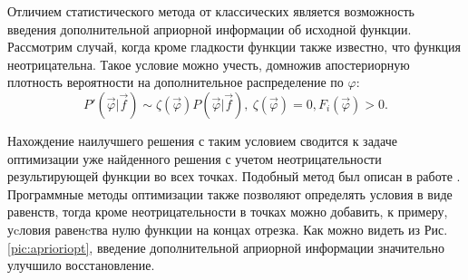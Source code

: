 Отличием статистического метода от классических является возможность введения дополнительной априорной информации об исходной функции. Рассмотрим случай, когда кроме гладкости функции также известно, что функция неотрицательна. Такое условие можно учесть, домножив апостериорную плотность вероятности на дополнительное распределение по $\varphi$:
\begin{equation}
    P'(\vec{\varphi}|\vec{f}) \sim \zeta(\vec{\varphi})P(\vec{\varphi}|\vec{f}), ~\zeta(\vec{\varphi})=0,  F_i(\vec{\varphi})>0. 
\end{equation}

Нахождение наилучшего решения с таким условием сводится к задаче оптимизации уже найденного решения с учетом неотрицательности результирующей функции во всех точках. Подобный метод был описан в работе \cite{turovceva}. Программные методы оптимизации также позволяют определять условия в виде равенств, тогда кроме неотрицательности в точках можно добавить, к примеру, уcловия равенcтва нулю функции на концах отрезка. Как можно видеть из Рис.\ref{pic:aprioriopt}, введение дополнительной априорной информации значительно улучшило восстановление.

\begin{comment}
\begin{figure}[h!]
\begin{center}
\begin{minipage}[h]{0.45\linewidth}
\texttt{[image: no-negative1]} \\а)
\end{minipage}
\hfill 
\begin{minipage}[h]{0.45\linewidth}
\texttt{[image: no-negative2]} \\б)
    \end{minipage}
    \caption{а) Результат регуляризации до добавления дополнительной информации. б) Результат оптимизации решения. Зеленая линия --- исходная функция, красная линия с точками --- результат регуляризации.}
\end{center}
\end{figure}
\end{comment}

